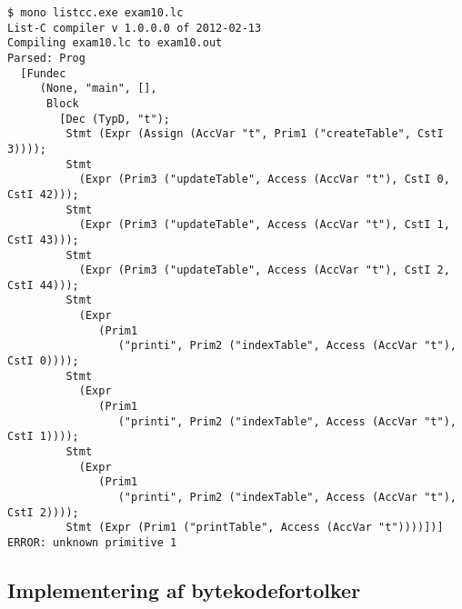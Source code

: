 \begin{verbatim}
$ mono listcc.exe exam10.lc
List-C compiler v 1.0.0.0 of 2012-02-13
Compiling exam10.lc to exam10.out
Parsed: Prog
  [Fundec
     (None, "main", [],
      Block
        [Dec (TypD, "t");
         Stmt (Expr (Assign (AccVar "t", Prim1 ("createTable", CstI 3))));
         Stmt
           (Expr (Prim3 ("updateTable", Access (AccVar "t"), CstI 0, CstI 42)));
         Stmt
           (Expr (Prim3 ("updateTable", Access (AccVar "t"), CstI 1, CstI 43)));
         Stmt
           (Expr (Prim3 ("updateTable", Access (AccVar "t"), CstI 2, CstI 44)));
         Stmt
           (Expr
              (Prim1
                 ("printi", Prim2 ("indexTable", Access (AccVar "t"), CstI 0))));
         Stmt
           (Expr
              (Prim1
                 ("printi", Prim2 ("indexTable", Access (AccVar "t"), CstI 1))));
         Stmt
           (Expr
              (Prim1
                 ("printi", Prim2 ("indexTable", Access (AccVar "t"), CstI 2))));
         Stmt (Expr (Prim1 ("printTable", Access (AccVar "t"))))])]
ERROR: unknown primitive 1
\end{verbatim}

\subsection{Implementering af bytekodefortolker}

